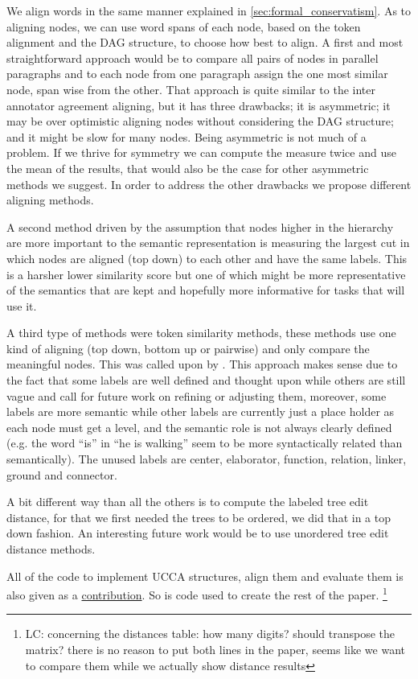 \documentclass[english]{article}
\newcommand{\lc}[1]{\footnote{\color{green}LC: #1}}
\begin{document}
We align words in the same manner explained in \ref{sec:formal_conservatism}.
As to aligning nodes, we can use word spans of each node, based on
the token alignment and the DAG structure, to choose how best to align.
A first and most straightforward approach would be to compare all
pairs of nodes in parallel paragraphs and to each node from one paragraph
assign the one most similar node, span wise from the other. That approach
is quite similar to the inter annotator agreement aligning, but it
has three drawbacks; it is asymmetric; it may be over optimistic aligning
nodes without considering the DAG structure; and it might be
slow for many nodes. Being asymmetric is not much of a problem. If we thrive for symmetry
we can compute the measure twice and use the mean of the results,
that would also be the case for other asymmetric methods we suggest.
In order to address the other drawbacks we propose different aligning methods.

A second method driven by the assumption that nodes higher in the
hierarchy are more important to the semantic representation is measuring
the largest cut in which nodes are aligned (top down) to each other
and have the same labels. This is a harsher lower similarity
score but one of which might be more representative of the semantics
that are kept and hopefully more informative for tasks that will use it.

A third type of methods were token similarity methods, these methods
use one kind of aligning (top down, bottom up or pairwise) and only
compare the meaningful nodes. This was called upon by \cite{sulem2015conceptual}. 
This approach makes sense due to the fact that some labels
are well defined and thought upon while others are still vague and
call for future work on refining or adjusting them, moreover, some
labels are more semantic while other labels are currently just a place
holder as each node must get a level, and the semantic role is not
always clearly defined (e.g. the word ``is'' in ``he is walking''
seem to be more syntactically related than semantically). The unused
labels are center, elaborator, function, relation, linker, ground
and connector.

A bit different way than all the others is to compute the labeled
tree edit distance\cite{zhang1989simple}, for that we first needed
the trees to be ordered, we did that in a top down fashion. An interesting
future work would be to use unordered tree edit distance methods\cite{zhang1992editing}.

All of the code to implement UCCA structures, align them and evaluate
them is also given as a \href{https://github.com/borgr/assess_learner_language}{contribution}.
So is code used to create the rest of the paper.
\lc{concerning the distances table: how many digits? should transpose the matrix? there is no reason to put both lines in the paper, seems like we want to compare them while we actually show distance results}
\end{document}
